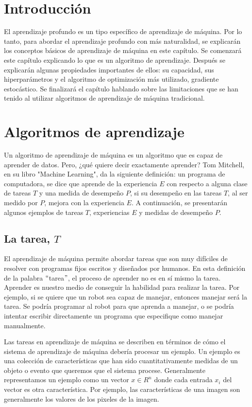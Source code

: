 \section{Introducción}
El aprendizaje profundo es un tipo específico de aprendizaje de máquina. Por lo tanto, para abordar el aprendizaje profundo con más naturalidad, se explicarán los conceptos básicos de aprendizaje de máquina en este capítulo. Se comenzará este capítulo explicando lo que es un algoritmo de aprendizaje. Después se explicarán algunas propiedades importantes de ellos: su capacidad, sus hiperparámetros y el algoritmo de optimización más utilizado, gradiente estocástico. Se finalizará el capítulo hablando sobre las limitaciones que se han tenido al utilizar algoritmos de aprendizaje de máquina tradicional.

\section{Algoritmos de aprendizaje}
Un algoritmo de aprendizaje de máquina es un algoritmo que es capaz de aprender de datos. Pero, ¿qué quiere decir exactamente aprender? Tom Mitchell, en su libro "Machine Learning", da la siguiente definición: un programa de computadora, se dice que aprende de la experiencia $E$ con respecto a alguna clase de tareas $T$ y una medida de desempeño $P$, si su desempeño en las tareas $T$, al ser medido por $P$, mejora con la experiencia $E$. A continuación, se presentarán algunos ejemplos de tareas $T$, experiencias $E$ y medidas de desempeño $P$. \cite{Mitchell:1997:ML:541177}

\subsection{La tarea, $T$}
El aprendizaje de máquina permite abordar tareas que son muy difíciles de resolver con programas fijos escritos y diseñados por humanos.
En esta definición de la palabra $``$tarea$"$, el proceso de aprender no es en sí mismo la tarea. Aprender es nuestro medio de conseguir la habilidad para realizar la tarea. Por ejemplo, si se quiere que un robot sea capaz de manejar, entonces manejar será la tarea. Se podría programar al robot para que aprenda a manejar, o se podría intentar escribir directamente un programa que especifique como manejar manualmente. \cite{goodfellow-et-al-2016} \cite{Mitchell:1997:ML:541177}

\vspace{1em}

Las tareas en aprendizaje de máquina se describen en términos de cómo el sistema de aprendizaje de máquina debería procesar un ejemplo. Un ejemplo es una colección de características que han sido cuantitativamente medidas de un objeto o evento que queremos que el sistema procese. Generalmente representamos un ejemplo como un vector $x \in R^n$ donde cada entrada $x_i$ del vector es otra característica. Por ejemplo, las características de una imagen son generalmente los valores de los pixeles de la imagen. \cite{goodfellow-et-al-2016}

